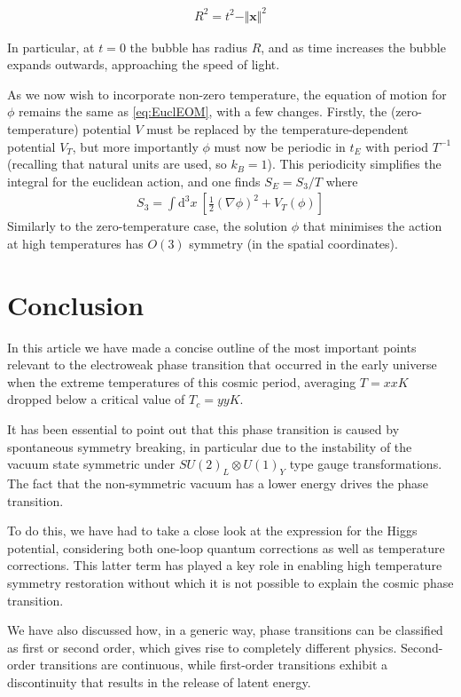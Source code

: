\documentclass{article}
\renewcommand{\bf}[1]{\mathbf{#1}}
\renewcommand{\d}{\mathrm{d}}
\numberwithin{equation}{section}
\begin{document}
\begin{align}
R^2 = t^2-\Vert\bf x\Vert^2
\end{align}

In particular, at $t=0$ the bubble has radius $R$, and as time increases the bubble expands outwards, approaching the speed of light.

As we now wish to incorporate non-zero temperature, the equation of motion for $\phi$ remains the same as \eqref{eq:EuclEOM}, with a few changes. Firstly, the (zero-temperature) potential $V$ must be replaced by the temperature-dependent potential $V_T$, but more importantly $\phi$ must now be periodic in $t_E$ with period $T^{-1}$ (recalling that natural units are used, so $k_B=1$). This periodicity simplifies the integral for the euclidean action, and one finds $S_E=S_3/T$ where
\begin{align}
S_3 = \int \d^3x\ \left [\frac{1}{2}(\nabla\phi)^2+V_T(\phi)\right ]
\end{align}
Similarly to the zero-temperature case, the solution $\phi$ that minimises the action at high temperatures has $O(3)$ symmetry (in the spatial coordinates).

\section{Conclusion} %
In this article we have made a concise outline of the most important points relevant to the electroweak phase transition that occurred in the early universe when the extreme temperatures of this cosmic period, averaging $T = xxK$ dropped below a critical value of $T_c=yyK$.

It has been essential to point out that this phase transition is caused by spontaneous symmetry breaking, in particular due to the instability of the vacuum state symmetric under $SU(2)_L \otimes U(1)_Y$ type gauge transformations. The fact that the non-symmetric vacuum has a lower energy drives the phase transition.

To do this, we have had to take a close look at the expression for the Higgs potential, considering both one-loop quantum corrections as well as temperature corrections. This latter term has played a key role in enabling high temperature symmetry restoration without which it is not possible to explain the cosmic phase transition.

We have also discussed how, in a generic way, phase transitions can be classified as first or second order, which gives rise to completely different physics. Second-order transitions are continuous, while first-order transitions exhibit a discontinuity that results in the release of latent energy. 
\end{document}
